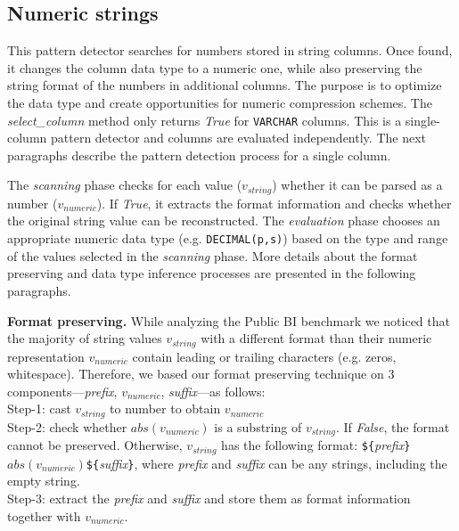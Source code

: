 \subsection{Numeric strings}
\label{subsec:pd:numericstrings}



\graphicspath{{5_automatic_learning/pattern_detection/images/}}

% 

This pattern detector searches for numbers stored in string columns. Once found, it changes the column data type to a numeric one, while also preserving the string format of the numbers in additional columns. The purpose is to optimize the data type and create opportunities for numeric compression schemes. The \textit{select\_column} method only returns \textit{True} for \verb|VARCHAR| columns. This is a single-column pattern detector and columns are evaluated independently. The next paragraphs describe the pattern detection process for a single column.

The \textit{scanning} phase checks for each value (\(v_{string}\)) whether it can be parsed as a number (\(v_{numeric}\)). If \textit{True}, it extracts the format information and checks whether the original string value can be reconstructed. The \textit{evaluation} phase chooses an appropriate numeric data type (e.g. \verb|DECIMAL(p,s)|) based on the type and range of the values selected in the \textit{scanning} phase. More details about the format preserving and data type inference processes are presented in the following paragraphs.

\textbf{Format preserving.} While analyzing the Public BI benchmark we noticed that the majority of string values \(v_{string}\) with a different format than their numeric representation \(v_{numeric}\) contain leading or trailing characters (e.g. zeros, whitespace). Therefore, we based our format preserving technique on 3 components---\textit{prefix}, \(v_{numeric}\), \textit{suffix}---as follows:\\
Step-1: cast \(v_{string}\) to number to obtain \(v_{numeric}\)\\
Step-2: check whether \(abs(v_{numeric})\) is a substring of \(v_{string}\). If \textit{False}, the format cannot be preserved. Otherwise, \(v_{string}\) has the following format:
\verb|${|\textit{prefix}\verb|}|\(abs(v_{numeric})\)\verb|${|\textit{suffix}\verb|}|,
where \textit{prefix} and \textit{suffix} can be any strings, including the empty string.\\
Step-3: extract the \textit{prefix} and \textit{suffix} and store them as format information together with \(v_{numeric}\).

